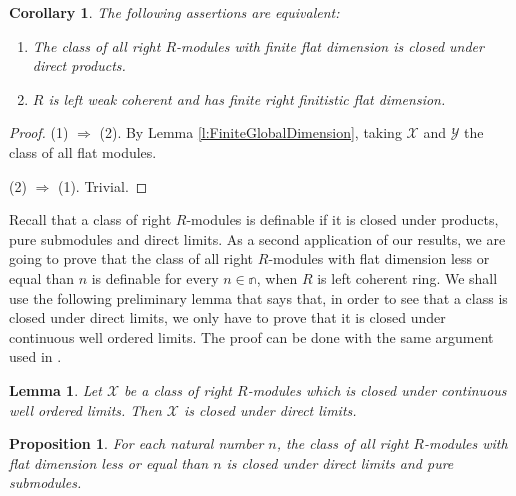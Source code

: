 \documentclass[a4paper,10pt]{amsart}
\newtheorem{proposition}[definition]{Proposition}
\newtheorem{lemma}[definition]{Lemma}
\newtheorem{corollary}[definition]{Corollary}
\begin{document}
\begin{corollary}
  The following assertions are equivalent:
  \begin{enumerate}
  \item The class of all right $R$-modules with finite flat dimension
    is closed under direct products.
  \item $R$ is left
    weak coherent and has finite right finitistic flat dimension.
  \end{enumerate}
\end{corollary}

\begin{proof}
  (1) $\Rightarrow$ (2). By Lemma \ref{l:FiniteGlobalDimension},
  taking $\mathcal X$ and $\mathcal Y$ the class of all flat modules.

 (2) $\Rightarrow$ (1). Trivial.
\end{proof}

Recall that a class of right $R$-modules is definable if it is closed
under products, pure submodules and direct limits. As a second
application of our results, we are going to prove that the class of
all right $R$-modules with flat dimension less or equal than $n$ is
definable for every $n \in \mathbb n$, when $R$ is left coherent
ring. We shall use the following preliminary lemma that says that, in
order to see that a class is closed under direct limits, we only have
to prove that it is closed under continuous well ordered limits. The
proof can be done with the same argument used in \cite[Corollary
1.7]{AdamekRosicky}.

\begin{lemma}
  Let $\mathcal X$ be a class of right $R$-modules which is closed under
  continuous well ordered limits. Then $\mathcal X$ is closed under
  direct limits.
\end{lemma}

\begin{proposition}\label{p:DirectLimits}
  For each natural number $n$, the class of all right $R$-modules with
  flat dimension less or equal than $n$ is closed
  under direct limits and pure submodules.
\end{proposition}
\end{document}

